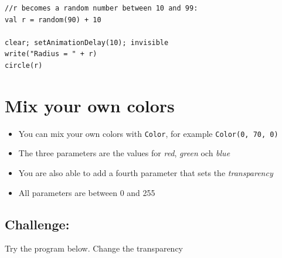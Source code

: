   

\begin{lstlisting}[basicstyle={\ttfamily\fontsize{20}{24}\selectfont},numbers=none]
//r becomes a random number between 10 and 99:
val r = random(90) + 10   

clear; setAnimationDelay(10); invisible
write("Radius = " + r)
circle(r)
\end{lstlisting}
        
\chapter{Mix your own colors}

\begin{itemize}

\item {You can mix your own colors with \lstinline{Color}, for example \lstinline{Color(0, 70, 0)}}
\item {The three parameters are the values for {\it red}, {\it green} och {\it blue}}
\item {You are also able to add a fourth parameter that sets the {\it transparency}}
\item {All parameters are between 0 and 255}

\end{itemize}


\section*{\color{BrickRed}Challenge:}
Try the program below. Change the transparency

